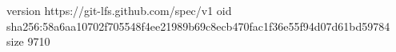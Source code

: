 version https://git-lfs.github.com/spec/v1
oid sha256:58a6aa10702f705548f4ee21989b69c8ecb470fac1f36e55f94d07d61bd59784
size 9710
